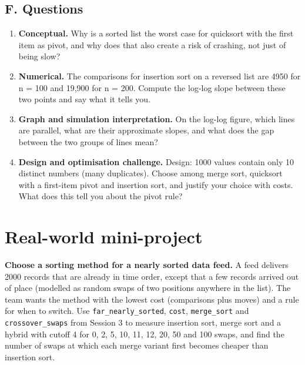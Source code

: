 \documentclass[11pt,a4paper]{article}
\begin{document}
\subsection*{F. Questions}
\begin{enumerate}[nosep]
\item \textbf{Conceptual.} Why is a sorted list the worst case for quicksort with the first item as pivot, and why does that also create a risk of crashing, not just of being slow?
\item \textbf{Numerical.} The comparisons for insertion sort on a reversed list are 4950 for n = 100 and 19,900 for n = 200. Compute the log-log slope between these two points and say what it tells you.
\item \textbf{Graph and simulation interpretation.} On the log-log figure, which lines are parallel, what are their approximate slopes, and what does the gap between the two groups of lines mean?
\item \textbf{Design and optimisation challenge.} Design: 1000 values contain only 10 distinct numbers (many duplicates). Choose among merge sort, quicksort with a first-item pivot and insertion sort, and justify your choice with costs. What does this tell you about the pivot rule?
\end{enumerate}

\section{Real-world mini-project}
\textbf{Choose a sorting method for a nearly sorted data feed.} A feed delivers 2000 records that are already in time order, except that a few records arrived out of place (modelled as random swaps of two positions anywhere in the list). The team wants the method with the lowest cost (comparisons plus moves) and a rule for when to switch. Use \texttt{far\_nearly\_sorted}, \texttt{cost}, \texttt{merge\_sort} and \texttt{crossover\_swaps} from Session 3 to measure insertion sort, merge sort and a hybrid with cutoff 4 for 0, 2, 5, 10, 11, 12, 20, 50 and 100 swaps, and find the number of swaps at which each merge variant first becomes cheaper than insertion sort.
\end{document}
